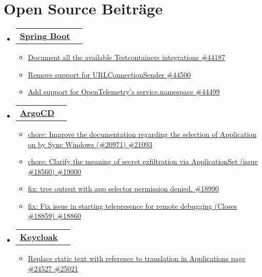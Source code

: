 \documentclass[a4paper,12pt]{article}
\makeatletter
\newcommand{\resumeItem}[1]{
	\item\small{
		{#1 \vspace{-2pt}}
	}
}
\newcommand{\resumeSubheadingSingleLine}[2]{
	\vspace{-2pt}\item
	\begin{tabular*}{0.97\textwidth}[t]{l@{\extracolsep{\fill}}r}
		\textbf{#1} & #2
	\end{tabular*}\vspace{-7pt}
}
\newcommand{\resumeSubHeadingListStart}{\begin{itemize}[leftmargin=0.15in, label={}]}
\newcommand{\resumeSubHeadingListEnd}{\end{itemize}}
\newcommand{\resumeItemListStart}{\begin{itemize}}
\newcommand{\resumeItemListEnd}{\end{itemize}\vspace{-5pt}}
\makeatother
\begin{document}
\section{Open Source Beiträge}
\resumeSubHeadingListStart
	\resumeSubheadingSingleLine{ \href{https://github.com/spring-projects/spring-boot/pulls/thecooldrop}{Spring Boot}}{}{}{}
		\resumeItemListStart[label=]
			\resumeItem{\href{https://github.com/spring-projects/spring-boot/pull/44187}{Document all the available Testcontainers integrations \#44187}}
			\resumeItem{\href{https://github.com/spring-projects/spring-boot/pull/44500}{Remove support for URLConnectionSender \#44500}}
			\resumeItem{\href{https://github.com/spring-projects/spring-boot/pull/44499}{Add support for OpenTelemetry's service.namespace \#44499}}
		\resumeItemListEnd
	\resumeSubheadingSingleLine{ \href{https://github.com/argoproj/argo-cd/pulls/thecooldrop}{ArgoCD}}{}{}{}
		\resumeItemListStart[label=]
			\resumeItem{\href{https://github.com/argoproj/argo-cd/pull/21093}{chore: Improve the documentation regarding the selection of Application on by Sync Windows (\#20971) \#21093}}
			\resumeItem{\href{https://github.com/argoproj/argo-cd/pull/19000}{chore: Clarify the meaning of secret exfiltration via ApplicationSet (issue \#18560) \#19000}}
			\resumeItem{\href{https://github.com/argoproj/argo-cd/pull/18990}{fix: tree output with app selector permission denied. \#18990}}
			\resumeItem{\href{https://github.com/argoproj/argo-cd/pull/18860}{fix: Fix issue in starting telepresence for remote debugging (Closes \#18859) \#18860}}
		\resumeItemListEnd
	\resumeSubheadingSingleLine{ \href{https://github.com/keycloak/keycloak/pulls/thecooldrop}{Keycloak}}{}{}{}
		\resumeItemListStart[label=]
		\resumeItem{\href{https://github.com/keycloak/keycloak/pull/25021}{Replace static text with reference to translation in Applications page \#24527 \#25021}}
		\resumeItemListEnd
\resumeSubHeadingListEnd
\end{document}
